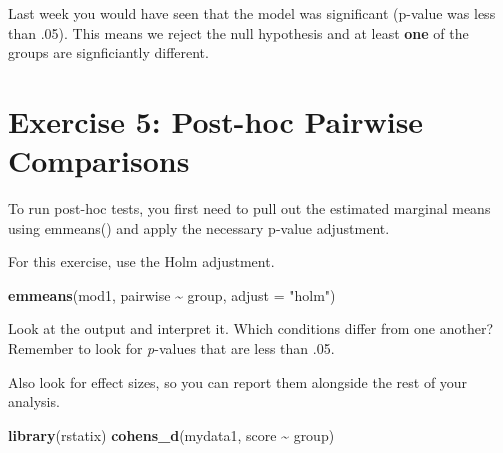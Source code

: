 \documentclass[
]{book}
\newenvironment{Shaded}{\begin{snugshade}}{\end{snugshade}}
\newcommand{\AttributeTok}[1]{\textcolor[rgb]{0.13,0.29,0.53}{#1}}
\newcommand{\ConstantTok}[1]{\textcolor[rgb]{0.56,0.35,0.01}{#1}}
\newcommand{\DecValTok}[1]{\textcolor[rgb]{0.00,0.00,0.81}{#1}}
\newcommand{\FunctionTok}[1]{\textcolor[rgb]{0.13,0.29,0.53}{\textbf{#1}}}
\newcommand{\NormalTok}[1]{#1}
\newcommand{\OtherTok}[1]{\textcolor[rgb]{0.56,0.35,0.01}{#1}}
\newcommand{\SpecialCharTok}[1]{\textcolor[rgb]{0.81,0.36,0.00}{\textbf{#1}}}
\newcommand{\StringTok}[1]{\textcolor[rgb]{0.31,0.60,0.02}{#1}}
\let\oldsection\section
\renewcommand{\section}{\needspace{5\baselineskip}\oldsection}
\begin{document}
\begin{Shaded}
\end{Shaded}

Last week you would have seen that the model was significant (p-value was less than .05). This means we reject the null hypothesis and at least \textbf{one} of the groups are signficiantly different.

\section{Exercise 5: Post-hoc Pairwise Comparisons}\label{exercise-5-post-hoc-pairwise-comparisons}

To run post-hoc tests, you first need to pull out the estimated marginal means using emmeans() and apply the necessary p-value adjustment.

For this exercise, use the Holm adjustment.

\begin{Shaded}
\begin{Highlighting}[]
\FunctionTok{emmeans}\NormalTok{(mod1,}
\NormalTok{        pairwise }\SpecialCharTok{\textasciitilde{}}\NormalTok{ group,}
        \AttributeTok{adjust =} \StringTok{"holm"}\NormalTok{)}
\end{Highlighting}
\end{Shaded}

Look at the output and interpret it. Which conditions differ from one another? Remember to look for \emph{p}-values that are less than .05.

Also look for effect sizes, so you can report them alongside the rest of your analysis.

\begin{Shaded}
\begin{Highlighting}[]
\FunctionTok{library}\NormalTok{(rstatix)}
\FunctionTok{cohens\_d}\NormalTok{(mydata1, score }\SpecialCharTok{\textasciitilde{}}\NormalTok{ group)}
\end{Highlighting}
\end{Shaded}
\end{document}
